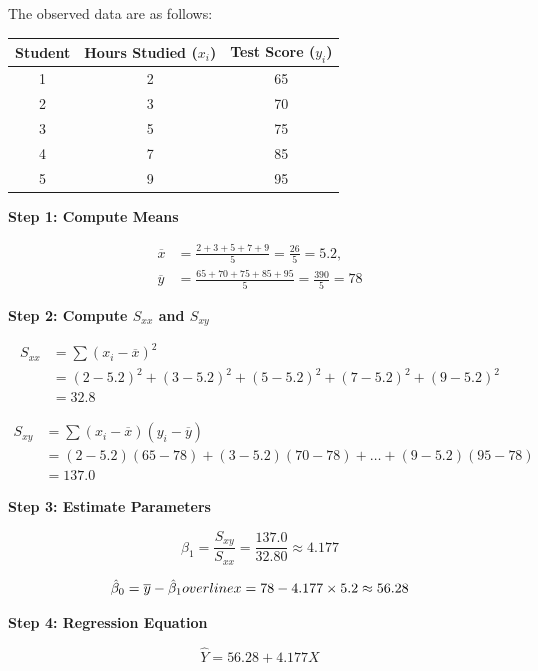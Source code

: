 \documentclass[twoside]{book}
\begin{document}
The observed data are as follows:

\begin{center}
\begin{tabular}{c|c|c}
\toprule
\textbf{Student} & \textbf{Hours Studied} (\(x_i\)) & \textbf{Test Score} (\(y_i\)) \\
\midrule
1 & 2 & 65 \\
2 & 3 & 70 \\
3 & 5 & 75 \\
4 & 7 & 85 \\
5 & 9 & 95 \\
\bottomrule
\end{tabular}
\end{center}

\textbf{Step 1: Compute Means}

\begin{align*}
    \overline{x} &= \frac{2 + 3 + 5 + 7 + 9}{5} = \frac{26}{5} = 5.2, \\
\overline{y} &= \frac{65 + 70 + 75 + 85 + 95}{5} = \frac{390}{5} = 78
\end{align*}

\textbf{Step 2: Compute $S_{xx}$ and $S_{xy}$}

\begin{align*}
    S_{xx} &= \sum (x_i - \overline{x})^2 \\
    &= (2 - 5.2)^2 + (3 - 5.2)^2 + (5 - 5.2)^2 + (7 - 5.2)^2 + (9 - 5.2)^2 \\
    &= 32.8
\end{align*}

\begin{align*}
    S_{xy} &= \sum (x_i - \overline{x})(y_i - \overline{y}) \\
    &= (2 - 5.2)(65 - 78) + (3 - 5.2)(70 - 78) + \ldots + (9 - 5.2)(95 - 78) \\
    &= 137.0
\end{align*}


\textbf{Step 3: Estimate Parameters}

\[
\hat{\beta}_1 = \frac{S_{xy}}{S_{xx}} = \frac{137.0}{32.80}\approx4.177
\]

\[
\hat{\beta}_0 = \overline{y} - \hat{\beta}_1 \\\\\\\\overline{x} = 78-4.177\times 5.2\approx56.28
\]

\textbf{Step 4: Regression Equation}

\[
\hat{Y} = 56.28 + 4.177X
\]
\end{document}
